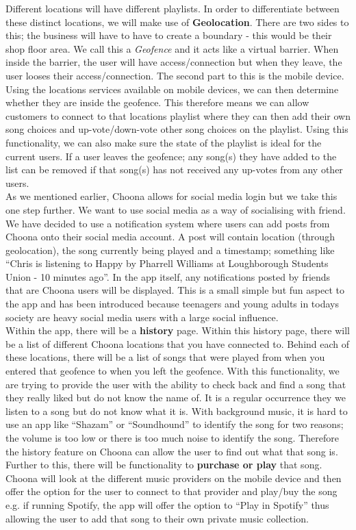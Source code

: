 Different locations will have different playlists.  In order to differentiate between these distinct locations, we will make use of \textbf{Geolocation}.  There are two sides to this; the business will have to have to create a boundary - this would be their shop floor area.  We call this a \emph{Geofence} and it acts like a virtual barrier.  When inside the barrier, the user will have access/connection but when they leave, the user looses their access/connection.  The second part to this is the mobile device.  Using the locations services available on mobile devices, we can then determine whether they are inside the geofence.  This therefore means we can allow customers to connect to that locations playlist where they can then add their own song choices and up-vote/down-vote other song choices on the playlist.  
Using this functionality, we can also make sure the state of the playlist is ideal for the current users.  If a user leaves the geofence; any song(s) they have added to the list can be removed if that song(s) has not received any up-votes from any other users. \\

As we mentioned earlier, Choona allows for social media login but we take this one step further.  We want to use social media as a way of socialising with friend.  We have decided to use a notification system where users can add posts from Choona onto their social media account.  A post will contain location (through geolocation), the song currently being played and a timestamp; something like ``Chris is listening to Happy by Pharrell Williams at Loughborough Students Union - 10 minutes ago''.    In the app itself, any notifications posted by friends that are Choona users will be displayed.  This is a small simple but fun aspect to the app and has been introduced because teenagers and young adults in todays society are heavy social media users with a large social influence.  \\

Within the app, there will be a \textbf{history} page.  Within this history page, there will be a list of different Choona locations that you have connected to.  Behind each of these locations, there will be a list of songs that were played from when you entered that geofence to when you left the geofence.  With this functionality, we are trying to provide the user with the ability to check back and find a song that they really liked but do not know the name of.  It is a regular occurrence they we listen to a song but do not know what it is.  With background music, it is hard to use an app like ``Shazam'' or ``Soundhound'' to identify the song for two reasons; the volume is too low or there is too much noise to identify the song.  Therefore the history feature on Choona can allow the user to find out what that song is.  Further to this, there will be functionality to \textbf{purchase or play} that song.  Choona will look at the different music providers on the mobile device and then offer the option for the user to connect to that provider and play/buy the song e.g. if running Spotify, the app will offer the option to ``Play in Spotify'' thus allowing the user to add that song to their own private music collection.  \\


